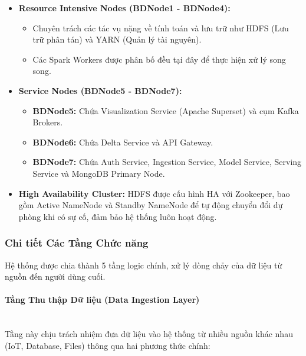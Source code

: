 \begin{itemize}
    \item \textbf{Resource Intensive Nodes (BDNode1 - BDNode4):} 
    \begin{itemize}
        \item Chuyên trách các tác vụ nặng về tính toán và lưu trữ như HDFS (Lưu trữ phân tán) và YARN (Quản lý tài nguyên).
        \item Các Spark Workers được phân bố đều tại đây để thực hiện xử lý song song.
    \end{itemize}
    \item \textbf{Service Nodes (BDNode5 - BDNode7):}
    \begin{itemize}
        \item \textbf{BDNode5:} Chứa Visualization Service (Apache Superset) và cụm Kafka Brokers.
        \item \textbf{BDNode6:} Chứa Delta Service và API Gateway.
        \item \textbf{BDNode7:} Chứa Auth Service, Ingestion Service, Model Service, Serving Service và MongoDB Primary Node.
    \end{itemize}
    \item \textbf{High Availability Cluster:} HDFS được cấu hình HA với Zookeeper, bao gồm Active NameNode và Standby NameNode để tự động chuyển đổi dự phòng khi có sự cố, đảm bảo hệ thống luôn hoạt động.
\end{itemize}

\subsubsection{Chi tiết Các Tầng Chức năng}
Hệ thống được chia thành 5 tầng logic chính, xử lý dòng chảy của dữ liệu từ nguồn đến người dùng cuối.

\paragraph{Tầng Thu thập Dữ liệu (Data Ingestion Layer)}
\mbox{}\\
Tầng này chịu trách nhiệm đưa dữ liệu vào hệ thống từ nhiều nguồn khác nhau (IoT, Database, Files) thông qua hai phương thức chính:

